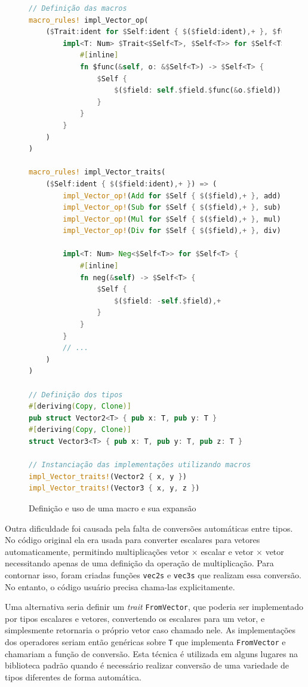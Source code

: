 \documentclass[tg]{mdtufsm}
\begin{document}
\begin{figure}
\begin{lstlisting}[language=Rust]
// Definição das macros
macro_rules! impl_Vector_op(
	($Trait:ident for $Self:ident { $($field:ident),+ }, $func:ident) => (
		impl<T: Num> $Trait<$Self<T>, $Self<T>> for $Self<T> {
			#[inline]
			fn $func(&self, o: &$Self<T>) -> $Self<T> {
				$Self {
					$($field: self.$field.$func(&o.$field)),+
				}
			}
		}
	)
)

macro_rules! impl_Vector_traits(
	($Self:ident { $($field:ident),+ }) => (
		impl_Vector_op!(Add for $Self { $($field),+ }, add)
		impl_Vector_op!(Sub for $Self { $($field),+ }, sub)
		impl_Vector_op!(Mul for $Self { $($field),+ }, mul)
		impl_Vector_op!(Div for $Self { $($field),+ }, div)

		impl<T: Num> Neg<$Self<T>> for $Self<T> {
			#[inline]
			fn neg(&self) -> $Self<T> {
				$Self {
					$($field: -self.$field),+
				}
			}
		}
		// ...
	)
)

// Definição dos tipos
#[deriving(Copy, Clone)]
pub struct Vector2<T> { pub x: T, pub y: T }
#[deriving(Copy, Clone)]
struct Vector3<T> { pub x: T, pub y: T, pub z: T }

// Instanciação das implementações utilizando macros
impl_Vector_traits!(Vector2 { x, y })
impl_Vector_traits!(Vector3 { x, y, z })
\end{lstlisting}
	\caption{Definição e uso de uma macro e sua expansão}
	\label{code:mathmacro}
\end{figure}

Outra dificuldade foi causada pela falta de conversões automáticas entre tipos. No código original ela era usada para converter escalares para vetores automaticamente, permitindo multiplicações vetor $\times$ escalar e vetor $\times$ vetor necessitando apenas de uma definição da operação de multiplicação. Para contornar isso, foram criadas funções \texttt{vec2s} e \texttt{vec3s} que realizam essa conversão. No entanto, o código usuário precisa chama-las explicitamente.

Uma alternativa seria definir um \emph{trait} \texttt{FromVector}, que poderia ser implementado por tipos escalares e vetores, convertendo os escalares para um vetor, e simplesmente retornaria o próprio vetor caso chamado nele. As implementações dos operadores seriam então genéricas sobre \texttt{T} que implementa \texttt{FromVector} e chamariam a função de conversão. Esta técnica é utilizada em alguns lugares na biblioteca padrão quando é necessário realizar conversão de uma variedade de tipos diferentes de forma automática.
\end{document}
